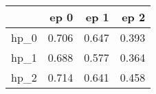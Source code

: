 \begin{tabular}{lrrr}
\toprule
{} &   ep 0 &   ep 1 &   ep 2 \\
\midrule
hp\_0 &  0.706 &  0.647 &  0.393 \\
hp\_1 &  0.688 &  0.577 &  0.364 \\
hp\_2 &  0.714 &  0.641 &  0.458 \\
\bottomrule
\end{tabular}
